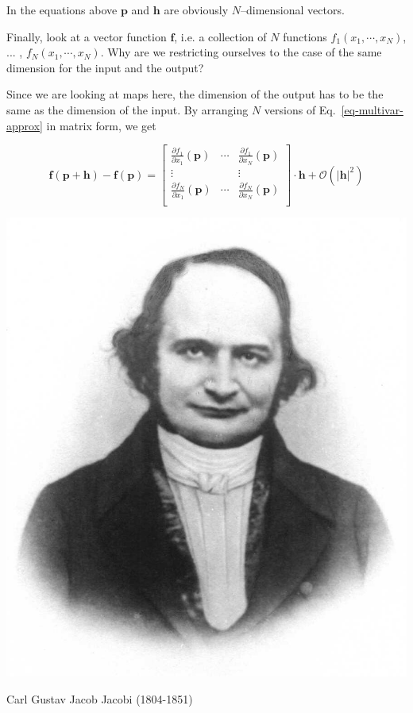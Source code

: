 In the equations above $\mathbf p$ and $\mathbf h$ are obviously $N$--dimensional vectors.

\begin{cue}
Finally, look at a vector function $\mathbf f$, i.e. a collection of $N$ functions $f_1(x_1, \cdots, x_N)$, ... , $f_N(x_1, \cdots, x_N)$. Why are we restricting ourselves to the case of the same dimension for the input and the output?
\end{cue}

Since we are looking at maps here, the dimension of the output has to be the same as the dimension of the input. By arranging $N$ versions of Eq.~\ref{eq-multivar-approx} in matrix form, we get

\begin{equation}
{\mathbf f}({\mathbf p} + {\mathbf h}) - {\mathbf f}({\mathbf p}) = \begin{bmatrix}
\frac{\partial f_1}{\partial x_1}({\mathbf p}) & \cdots & \frac{\partial f_1}{\partial x_N}({\mathbf p}) \\
\vdots & & \vdots \\
\frac{\partial f_N}{\partial x_1}({\mathbf p}) & \cdots & \frac{\partial f_N}{\partial x_N}({\mathbf p}) \\
\end{bmatrix} \cdot {\mathbf h} + \mathcal{O}\left(|{\mathbf h}|^2\right)
  \label{eq-jacobian}
\end{equation}


\begin{marginfigure}[-5.7cm]
  \includegraphics{numeric/figures/c_jacobi}
  \caption{Carl Gustav Jacob Jacobi (1804-1851)}
\end{marginfigure}

